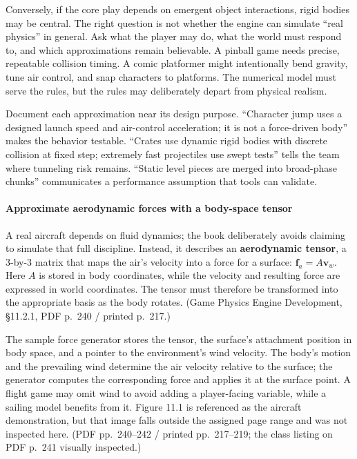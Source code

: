 Conversely, if the core play depends on emergent object interactions, rigid bodies may be central. The right question is not whether the engine can simulate ``real physics'' in general. Ask what the player may do, what the world must respond to, and which approximations remain believable. A pinball game needs precise, repeatable collision timing. A comic platformer might intentionally bend gravity, tune air control, and snap characters to platforms. The numerical model must serve the rules, but the rules may deliberately depart from physical realism.

Document each approximation near its design purpose. ``Character jump uses a designed launch speed and air-control acceleration; it is not a force-driven body'' makes the behavior testable. ``Crates use dynamic rigid bodies with discrete collision at fixed step; extremely fast projectiles use swept tests'' tells the team where tunneling risk remains. ``Static level pieces are merged into broad-phase chunks'' communicates a performance assumption that tools can validate.

\paragraph{Approximate aerodynamic forces with a body-space tensor}\label{06-engine-ii-ch033-approximate-aerodynamic-forces-with-a-body-space-tensor}

\hypertarget{06-engine-ii-ch033-approximate-aerodynamic-forces-with-a-body-space-tensor}{}

A real aircraft depends on fluid dynamics; the book deliberately avoids claiming to simulate that full discipline. Instead, it describes an \textbf{aerodynamic tensor}, a 3-by-3 matrix that maps the air's velocity into a force for a surface: \(\mathbf{f}_a = A\mathbf{v}_w\). Here \(A\) is stored in body coordinates, while the velocity and resulting force are expressed in world coordinates. The tensor must therefore be transformed into the appropriate basis as the body rotates. (Game Physics Engine Development, §11.2.1, PDF p.~240 / printed p.~217.)

The sample  force generator stores the tensor, the surface's attachment position in body space, and a pointer to the environment's wind velocity. The body's motion and the prevailing wind determine the air velocity relative to the surface; the generator computes the corresponding force and applies it at the surface point. A flight game may omit wind to avoid adding a player-facing variable, while a sailing model benefits from it. Figure 11.1 is referenced as the aircraft demonstration, but that image falls outside the assigned page range and was not inspected here. (PDF pp.~240--242 / printed pp.~217--219; the class listing on PDF p.~241 visually inspected.)

